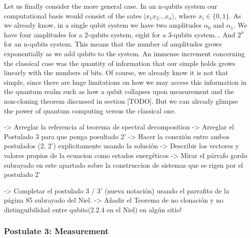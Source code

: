 \documentclass{article}
\begin{document}
	Let us finally consider the more general case. In an n-qubits system our computational basis would consist of the sates $|x_1 x_2 \dotsc x_n\rangle$, where $x_i \in \{0,1\}$. As we already know, in a single qubit system we have two amplitudes $\alpha_0$ and $\alpha_1$. We have four amplitudes for a 2-qubits system, eight for a 3-qubits system... And $2^n$ for an n-qubits system. This means that the number of amplitudes grows exponentially as we add qubits to the system. An immense increment concerning the classical case was the quantity of information that our simple holds grows linearly with the numbers of bits. Of course, we already know it is not that simple, since there are huge limitations on how we may access this information in the quantum realm such as how a qubit collapses upon measurement and the non-cloning theorem discussed in section [TODO]. But we can already glimpse the power of quantum computing versus the classical one.
	
	
	
	
	
	
	
	
	
	
	
	
	
	
	
	
	-> Arreglar la referencia al teorema de spectral decomposition
	-> Arreglar el Postulado 3 para que ponga posultado 2'
	-> Hacer la conexión entre ambos postulados (2, 2') explicitamente usando la solución
	-> Describir los vectores y valores propios de la ecuacion como estados energéticos
	-> Mirar el párrafo gordo subrayado en este apartado sobre la construccion de sistemas que se rigen por el postulado 2'
	
	
	-> Completar el postulado 3 / 3' (nueva notación) usando el parrafito de la página 85 subrayado del Niel.
	-> Añadir el Teorema de no clonación y no distinguibilidad entre qubits(2.2.4 en el Niel) en algún sitio!
	
	\subsubsection{Postulate 3: Measurement}
	
\end{document}
